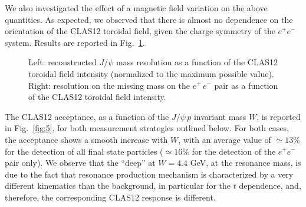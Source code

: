\documentclass[a4paper,10pt]{article}
\begin{document}
We also investigated the effect of a magnetic field variation on the above quantities. As expected, we observed that there is almost no dependence on the orientation of the CLAS12 toroidal field, given the charge symmetry of the $e^+ e^-$ system. Results are reported in Fig.~\ref{fig:4}.

\begin{figure}[tpb]
\caption{\footnotesize \label{fig:4} Left: reconstructed $J/\psi$ mass resolution as a function of the CLAS12 toroidal field intensity (normalized to the maximum possible value). Right: resolution on the missing mass on the $e^+\,e^-$ pair as a function of the CLAS12 toroidal field intensity.}
\end{figure}

The CLAS12 acceptance, as a function of the $J/\psi\, p$ invariant mass $W$, is reported in Fig.~\ref{fig:5}, for both measurement strategies outlined below. For both cases, the acceptance shows a smooth increase with $W$, with an average value of $\simeq 13\%$ for the detection of all final state particles ($\simeq 16\%$ for the detection of the $e^{+} e^{-}$ pair only). We observe that the ``deep'' at $W=4.4$ GeV, at the resonance mass, is due to the fact that resonance production mechanism is characterized by a very different kinematics than the background, in particular for the $t$ dependence, and, therefore, the corresponding CLAS12 response is different. 
\end{document}
